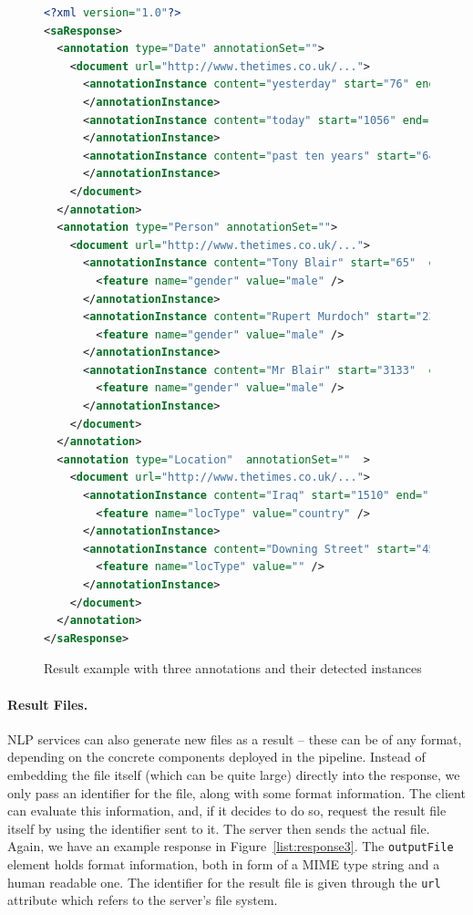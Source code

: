 \begin{figure}[htb]
\begin{lstlisting}[language=XML,xleftmargin=8mm,columns=flexible]
<?xml version="1.0"?>
<saResponse>
  <annotation type="Date" annotationSet="">
    <document url="http://www.thetimes.co.uk/...">
      <annotationInstance content="yesterday" start="76" end="85">
      </annotationInstance>
      <annotationInstance content="today" start="1056" end="1061">
      </annotationInstance>
      <annotationInstance content="past ten years" start="6477" end="6491">
      </annotationInstance>
    </document>
  </annotation>
  <annotation type="Person" annotationSet="">
    <document url="http://www.thetimes.co.uk/...">
      <annotationInstance content="Tony Blair" start="65"  end="75">
        <feature name="gender" value="male" />
      </annotationInstance>
      <annotationInstance content="Rupert Murdoch" start="2357" end="2371">
        <feature name="gender" value="male" />
      </annotationInstance>
      <annotationInstance content="Mr Blair" start="3133"  end="3141">
        <feature name="gender" value="male" />
      </annotationInstance>
    </document>
  </annotation>
  <annotation type="Location"  annotationSet=""  >
    <document url="http://www.thetimes.co.uk/...">
      <annotationInstance content="Iraq" start="1510" end="1514">
        <feature name="locType" value="country" />
      </annotationInstance>
      <annotationInstance content="Downing Street" start="4576" end="4590">
        <feature name="locType" value="" />
      </annotationInstance>
    </document>
  </annotation>
</saResponse>
\end{lstlisting}
\vspace*{-2mm}
\caption{Result example with three annotations and their detected instances}
\label{list:response2}
\end{figure}


\paragraph{Result Files.} NLP services can also generate new files as
a result -- these can be of any format, depending on the concrete
components deployed in the pipeline. Instead of embedding the file
itself (which can be quite large) directly into the response, we only
pass an identifier for the file, along with some format information.
The client can evaluate this information, and, if it decides to do so,
request the result file itself by using the identifier sent to it. The
server then sends the actual file. Again, we have an example response
in Figure~\ref{list:response3}. The \texttt{outputFile} element holds
format information, both in form of a MIME type string and a human
readable one. The identifier for the result file is given through the
\texttt{url} attribute which refers to the server's file system.

